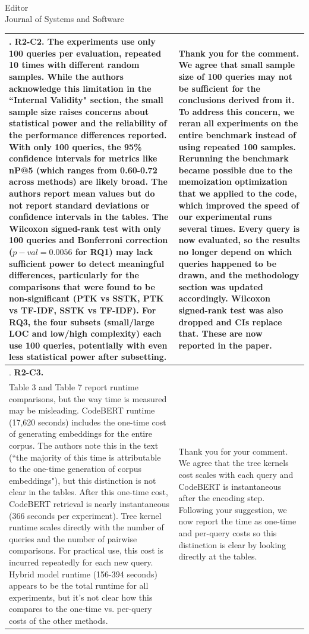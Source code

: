 \documentclass[
pagenumber=false, %
parskip=half, %
fromalign=right, %
foldmarks=false, %
addrfield=false %
]{scrlttr2}
\newcounter{commentcounter} %
\newcommand{\comment}[1]{\refstepcounter{commentcounter}\thecommentcounter.} %
\begin{document}
\begin{letter}{\\Editor\\Journal of Systems and Software}
\begin{longtable}{p{}p{}}
		\comment{2}	\textbf{R2-C2.} The experiments use only 100 queries per evaluation, repeated 10 times with different random samples. While the authors acknowledge this limitation in the ``Internal Validity" section, the small sample size raises concerns about statistical power and the reliability of the performance differences reported. With only 100 queries, the 95\% confidence intervals for metrics like nP@5 (which ranges from 0.60-0.72 across methods) are likely broad. The authors report mean values but do not report standard deviations or confidence intervals in the tables. The Wilcoxon signed-rank test with only 100 queries and Bonferroni correction ($p-val = 0.0056$ for RQ1) may lack sufficient power to detect meaningful differences, particularly for the comparisons that were found to be non-significant (PTK vs SSTK, PTK vs TF-IDF, SSTK vs TF-IDF). For RQ3, the four subsets (small/large LOC and low/high complexity) each use 100 queries, potentially with even less statistical power after subsetting.	& Thank you for the comment. We agree that small sample size of 100 queries may not be sufficient for the conclusions derived from it. To address this concern, we reran all experiments on the entire benchmark instead of using repeated 100 samples. Rerunning the benchmark became possible due to the memoization optimization that we applied to the code, which improved the speed of our experimental runs several times.		
		Every query is now evaluated, so the results no longer depend on which queries happened to be drawn, and the methodology section was updated accordingly. 
		Wilcoxon signed-rank test was also dropped and CIs replace that. These are now reported in the paper. \\ \midrule 
		
		\comment{2}\textbf{	R2-C3.} \\Table 3 and Table 7 report runtime comparisons, but the way time is measured may be misleading. CodeBERT runtime (17,620 seconds) includes the one-time cost of generating embeddings for the entire corpus. The authors note this in the text (``the majority of this time is attributable to the one-time generation of corpus embeddings"), but this distinction is not clear in the tables. After this one-time cost, CodeBERT retrieval is nearly instantaneous (366 seconds per experiment). Tree kernel runtime scales directly with the number of queries and the number of pairwise comparisons. For practical use, this cost is incurred repeatedly for each new query. Hybrid model runtime (156-394 seconds) appears to be the total runtime for all experiments, but it's not clear how this compares to the one-time vs. per-query costs of the other methods. & Thank you for your comment. We agree that the tree kernels cost scales with each query and CodeBERT is instantaneous after the encoding step. Following your suggestion, we now report the time as one-time and per-query costs so this distinction is clear by looking directly at the tables. 
		

\end{longtable}
\end{letter}
\end{document}
